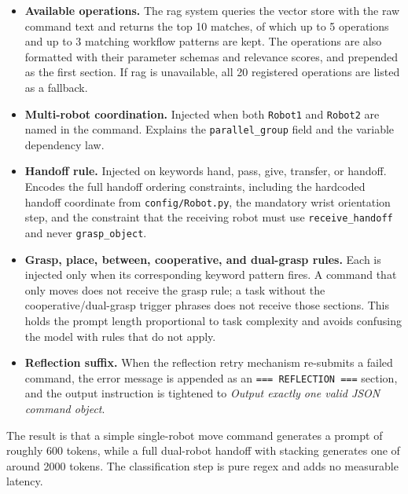 \begin{itemize}
	\item \textbf{Available operations.} The \gls{rag} system queries the vector store with the raw command text and returns the top 10 matches, of which up to 5 operations and up to 3 matching workflow patterns are kept. The operations are also formatted with their parameter schemas and relevance scores, and prepended as the first section. If \gls{rag} is unavailable, all 20 registered operations are listed as a fallback.
	\item \textbf{Multi-robot coordination.} Injected when both \texttt{Robot1} and \texttt{Robot2} are named in the command. Explains the \texttt{parallel\_group} field and the variable dependency law.
	\item \textbf{Handoff rule.} Injected on keywords hand, pass, give, transfer, or handoff. Encodes the full handoff ordering constraints, including the hardcoded handoff coordinate from \texttt{config/Robot.py}, the mandatory wrist orientation step, and the constraint that the receiving robot must use \texttt{receive\_handoff} and never \texttt{grasp\_object}.
	\item \textbf{Grasp, place, between, cooperative, and dual-grasp rules.} Each is injected only when its corresponding keyword pattern fires. A command that only moves does not receive the grasp rule; a task without the cooperative/dual-grasp trigger phrases does not receive those sections. This holds the prompt length proportional to task complexity and avoids confusing the model with rules that do not apply.
	\item \textbf{Reflection suffix.} When the reflection retry mechanism re-submits a failed command, the error message is appended as an \texttt{=== REFLECTION ===} section, and the output instruction is tightened to \textit{Output exactly one valid JSON command object}.
\end{itemize}

The result is that a simple single-robot move command generates a prompt of roughly 600 tokens, while a full dual-robot handoff with stacking generates one of around 2000 tokens. The classification step is pure regex and adds no measurable latency.


